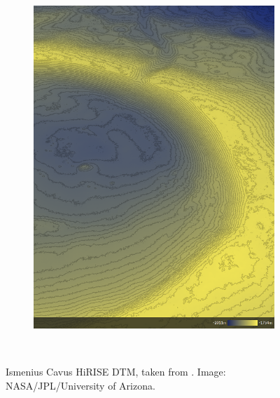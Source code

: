 \begin{figure}[h]
\begin{subfigure}[t]{\subfigureWidth}
        \label{fig:sub:ismenius-cavus-dtm}
    \end{subfigure}\hfill
    \begin{subfigure}[t]{\subfigureWidth}
        \centering
        \includegraphics[height=\graphicsHeight]{sections/mars-solar-energy/mission-sites/images/ismenius-cavus-dtm-altimetry.png}
		\label{fig:sub:ismenius-cavus-dtm-altimetry}
	\end{subfigure}\\[0.8ex]
    \caption[Ismenius Cavus HiRISE digital terrain model]
            {Ismenius Cavus \ac{HiRISE} \ac{DTM}, taken from . Image: \ac{NASA}/\ac{JPL}/University of Arizona.}
    \label{fig:ismenius-cavus}
\vspace{-2ex}
\end{figure}

